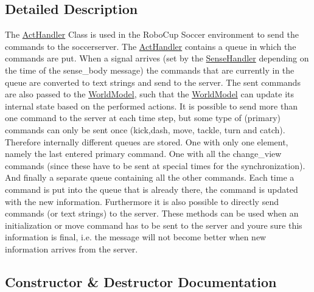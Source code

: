 \subsection{Detailed Description}
The \hyperlink{classActHandler}{Act\+Handler} Class is used in the Robo\+Cup Soccer environment to send the commands to the soccerserver. The \hyperlink{classActHandler}{Act\+Handler} contains a queue in which the commands are put. When a signal arrives (set by the \hyperlink{classSenseHandler}{Sense\+Handler} depending on the time of the sense\+\_\+body message) the commands that are currently in the queue are converted to text strings and send to the server. The sent commands are also passed to the \hyperlink{classWorldModel}{World\+Model}, such that the \hyperlink{classWorldModel}{World\+Model} can update its internal state based on the performed actions. It is possible to send more than one command to the server at each time step, but some type of (primary) commands can only be sent once (kick,dash, move, tackle, turn and catch). Therefore internally different queues are stored. One with only one element, namely the last entered primary command. One with all the change\+\_\+view commands (since these have to be sent at special times for the synchronization). And finally a separate queue containing all the other commands. Each time a command is put into the queue that is already there, the command is updated with the new information. Furthermore it is also possible to directly send commands (or text strings) to the server. These methods can be used when an initialization or move command has to be sent to the server and you\textquotesingle{}re sure this information is final, i.\+e. the message will not become better when new information arrives from the server. 

\subsection{Constructor \& Destructor Documentation}
